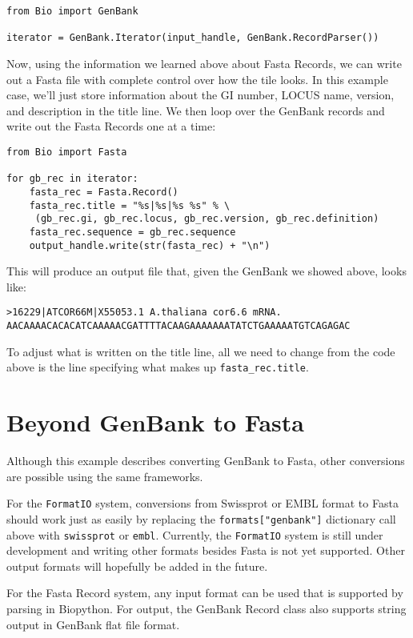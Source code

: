 \documentclass{article}
\begin{document}
\begin{verbatim}
from Bio import GenBank

iterator = GenBank.Iterator(input_handle, GenBank.RecordParser())
\end{verbatim}

Now, using the information we learned above about Fasta Records, we can
write out a Fasta file with complete control over how the tile looks. In
this example case, we'll just store information about the GI number,
LOCUS name, version, and description in the title line. We then loop
over the GenBank records and write out the Fasta Records one at a time:

\begin{verbatim}
from Bio import Fasta

for gb_rec in iterator:
    fasta_rec = Fasta.Record()
    fasta_rec.title = "%s|%s|%s %s" % \
     (gb_rec.gi, gb_rec.locus, gb_rec.version, gb_rec.definition)
    fasta_rec.sequence = gb_rec.sequence
    output_handle.write(str(fasta_rec) + "\n")
\end{verbatim}

This will produce an output file that, given the GenBank we showed
above, looks like:

\begin{verbatim}
>16229|ATCOR66M|X55053.1 A.thaliana cor6.6 mRNA.
AACAAAACACACATCAAAAACGATTTTACAAGAAAAAAATATCTGAAAAATGTCAGAGAC
\end{verbatim}

To adjust what is written on the title line, all we need to change from
the code above is the line specifying what makes up
\verb|fasta_rec.title|.

\section{Beyond GenBank to Fasta}

Although this example describes converting GenBank to Fasta, other
conversions are possible using the same frameworks.

For the \verb|FormatIO| system, conversions from Swissprot or EMBL
format to Fasta should work just as easily by replacing the
\verb|formats["genbank"]| dictionary call above with \verb|swissprot| or
\verb|embl|. Currently, the \verb|FormatIO| system is still under
development and writing other formats besides Fasta is not yet
supported. Other output formats will hopefully be added in the future.

For the Fasta Record system, any input format can be used that is
supported by parsing in Biopython. For output, the GenBank Record class
also supports string output in GenBank flat file format.
\end{document}
